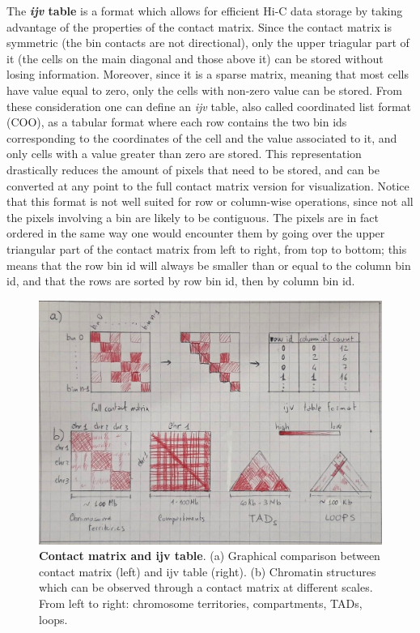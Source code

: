 The \textbf{\emph{ijv} table} is a format which allows for efficient Hi-C data storage by taking advantage of the properties of the contact matrix. Since the contact matrix is symmetric (the bin contacts are not directional), only the upper triagular part of it (the cells on the main diagonal and those above it) can be stored without losing information. Moreover, since it is a sparse matrix, meaning that most cells have value equal to zero, only the cells with non-zero value can be stored. From these consideration one can define an \emph{ijv} table, also called coordinated list format (COO), as a tabular format where each row contains the two bin ids corresponding to the coordinates of the cell and the value associated to it, and only cells with a value greater than zero are stored. This representation drastically reduces the amount of pixels that need to be stored, and can be converted at any point to the full contact matrix version for visualization. Notice that this format is not well suited for row or column-wise operations, since not all the pixels involving a bin are likely to be contiguous. The pixels are in fact ordered in the same way one would encounter them by going over the upper triangular part of the contact matrix from left to right, from top to bottom; this means that the row bin id will always be smaller than or equal to the column bin id, and that the rows are sorted by row bin id, then by column bin id.

\begin{figure}[ht]
  \centering
  \includegraphics[width=1\textwidth]{contact_matrix.jpeg}
  \caption{\textbf{Contact matrix and ijv table}. (a) Graphical comparison between contact matrix (left) and ijv table (right). (b) Chromatin structures which can be observed through a contact matrix at different scales. From left to right: chromosome territories, compartments, TADs, loops.}
  \label{fig:contacts}
\end{figure}

